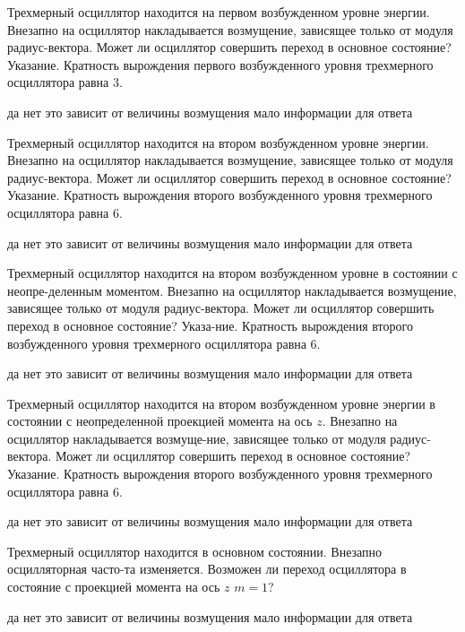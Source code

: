 \documentclass[11pt,a4paper]{exam}
\begin{document}
\begin{questions}
\question Трехмерный осциллятор находится на первом возбужденном уровне энергии. Внезапно на осциллятор накладывается возмущение, зависящее только от модуля радиус-вектора. Может ли осциллятор совершить переход в основное состояние? Указание. Кратность вырождения первого возбужденного уровня трехмерного осциллятора равна 3.
\begin{choices}
\choice да
\choice нет
\choice это зависит от величины возмущения
\choice мало информации для ответа
\end{choices}

\question Трехмерный осциллятор находится на втором возбужденном уровне энергии. Внезапно на осциллятор накладывается возмущение, зависящее только от модуля радиус-вектора. Может ли осциллятор совершить переход в основное состояние? Указание. Кратность вырождения второго возбужденного уровня трехмерного осциллятора равна 6.
\begin{choices}
\choice да
\choice нет
\choice это зависит от величины возмущения
\choice мало информации для ответа
\end{choices}

\question Трехмерный осциллятор находится на втором возбужденном уровне в состоянии с неопре-деленным моментом. Внезапно на осциллятор накладывается возмущение, зависящее только от модуля радиус-вектора. Может ли осциллятор совершить переход в основное состояние? Указа-ние. Кратность вырождения второго возбужденного уровня трехмерного осциллятора равна 6.
\begin{choices}
\choice да
\choice нет
\choice это зависит от величины возмущения
\choice мало информации для ответа
\end{choices}

\question Трехмерный осциллятор находится на втором возбужденном уровне энергии в состоянии с неопределенной проекцией момента на ось $z$. Внезапно на осциллятор накладывается возмуще-ние, зависящее только от модуля радиус-вектора. Может ли осциллятор совершить переход в основное состояние? Указание. Кратность вырождения второго возбужденного уровня трехмерного осциллятора равна 6.
\begin{choices}
\choice да
\choice нет
\choice это зависит от величины возмущения
\choice мало информации для ответа
\end{choices}

\question Трехмерный осциллятор находится в основном состоянии. Внезапно осцилляторная часто-та изменяется. Возможен ли переход осциллятора в состояние с проекцией момента на ось $z$ $m = 1$?
\begin{choices}
\choice да
\choice нет
\choice это зависит от величины возмущения
\choice мало информации для ответа
\end{choices}


\end{questions}
\end{document}
